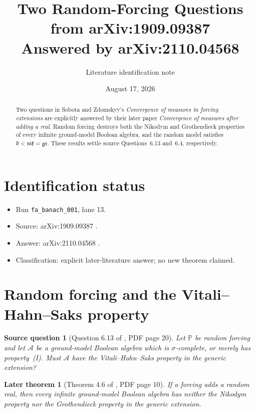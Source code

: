 \documentclass[11pt]{article}
\title{Two Random-Forcing Questions from arXiv:1909.09387\\Answered by arXiv:2110.04568}
\author{Literature identification note}
\date{August 17, 2026}
\newtheorem*{sourcequestion}{Source question}
\newtheorem*{answertheorem}{Later theorem}
\begin{document}
\maketitle

\begin{abstract}
Two questions in Sobota and Zdomskyy's \emph{Convergence of measures in
forcing extensions} are explicitly answered by their later paper
\emph{Convergence of measures after adding a real}.  Random forcing destroys
both the Nikodym and Grothendieck properties of every infinite ground-model
Boolean algebra, and the random model satisfies
$\mathfrak d<\mathfrak{nik}=\mathfrak{gr}$.  These results settle source
Questions~6.13 and~6.4, respectively.
\end{abstract}

\section*{Identification status}

\begin{itemize}
\item Run \texttt{fa\_banach\_001}, lane 13.
\item Source: arXiv:1909.09387 \cite{source}.
\item Answer: arXiv:2110.04568 \cite{answer}.
\item Classification: explicit later-literature answer; no new theorem claimed.
\end{itemize}

\section{Random forcing and the Vitali--Hahn--Saks property}

\begin{sourcequestion}[Question 6.13 of \cite{source}, PDF page 20]
Let $\mathbb P$ be random forcing and let $\mathcal A$ be a ground-model
Boolean algebra which is $\sigma$-complete, or merely has property~(I).
Must $\mathcal A$ have the Vitali--Hahn--Saks property in the generic
extension?
\end{sourcequestion}

\begin{answertheorem}[Theorem 4.6 of \cite{answer}, PDF page 10]
If a forcing adds a random real, then every infinite ground-model Boolean
algebra has neither the Nikodym property nor the Grothendieck property in the
generic extension.
\end{answertheorem}
\end{document}
